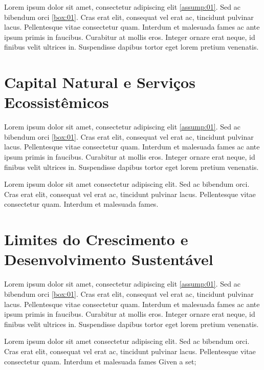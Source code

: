 \documentclass[./main.tex]{subfiles}
\begin{document}
\par Lorem ipsum dolor sit amet, consectetur adipiscing elit \ref{assump:01}. Sed ac bibendum orci \ref{box:01}. Cras erat elit, consequat vel erat ac, tincidunt pulvinar lacus. Pellentesque vitae consectetur quam. Interdum et malesuada fames ac ante ipsum primis in faucibus. Curabitur at mollis eros. Integer ornare erat neque, id finibus velit ultrices in. Suspendisse dapibus tortor eget lorem pretium venenatis.

\section{Capital Natural e Serviços Ecossistêmicos}

\par Lorem ipsum dolor sit amet, consectetur adipiscing elit \ref{assump:01}. Sed ac bibendum orci \ref{box:01}. Cras erat elit, consequat vel erat ac, tincidunt pulvinar lacus. Pellentesque vitae consectetur quam. Interdum et malesuada fames ac ante ipsum primis in faucibus. Curabitur at mollis eros. Integer ornare erat neque, id finibus velit ultrices in. Suspendisse dapibus tortor eget lorem pretium venenatis.

\par Lorem ipsum dolor sit amet consectetur adipiscing elit. Sed ac bibendum orci. Cras \cite{popper2004logica} erat elit, consequat vel erat ac, tincidunt pulvinar lacus. Pellentesque vitae consectetur quam. Interdum et malesuada fames.

\section{Limites do Crescimento e Desenvolvimento Sustentável}

\par Lorem ipsum dolor sit amet, consectetur adipiscing elit \ref{assump:01}. Sed ac bibendum orci \ref{box:01}. Cras erat elit, consequat vel erat ac, tincidunt pulvinar lacus. Pellentesque vitae consectetur quam. Interdum et malesuada fames ac ante ipsum primis in faucibus. Curabitur at mollis eros. Integer ornare erat neque, id finibus velit ultrices in. Suspendisse dapibus tortor eget lorem pretium venenatis.

\par Lorem ipsum dolor sit amet consectetur adipiscing elit. Sed ac bibendum orci. Cras \cite{popper2004logica} erat elit, consequat vel erat ac, tincidunt pulvinar lacus. Pellentesque vitae consectetur quam. Interdum et malesuada fames Given a set;
\end{document}
